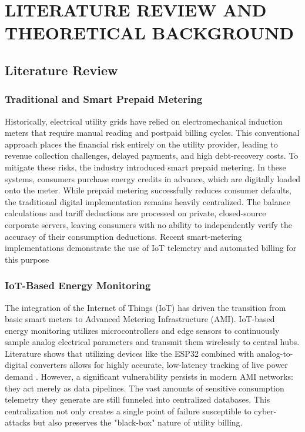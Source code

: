 \chapter{LITERATURE REVIEW AND THEORETICAL BACKGROUND}

\section{Literature Review}
\subsection{Traditional and Smart Prepaid Metering}
Historically, electrical utility grids have relied on electromechanical induction meters that require manual reading and postpaid billing cycles. This conventional approach places the financial risk entirely on the utility provider, leading to revenue collection challenges, delayed payments, and high debt-recovery costs. To mitigate these risks, the industry introduced smart prepaid metering. In these systems, consumers purchase energy credits in advance, which are digitally loaded onto the meter. While prepaid metering successfully reduces consumer defaults, the traditional digital implementation remains heavily centralized. The balance calculations and tariff deductions are processed on private, closed-source corporate servers, leaving consumers with no ability to independently verify the accuracy of their consumption deductions. Recent smart-metering implementations demonstrate the use of IoT telemetry and automated billing for this purpose 

\subsection{IoT-Based Energy Monitoring}
The integration of the Internet of Things (IoT) has driven the transition from basic smart meters to Advanced Metering Infrastructure (AMI). IoT-based energy monitoring utilizes microcontrollers and edge sensors to continuously sample analog electrical parameters and transmit them wirelessly to central hubs. Literature shows that utilizing devices like the ESP32 combined with analog-to-digital converters allows for highly accurate, low-latency tracking of live power demand \cite{zhao2020energy}. However, a significant vulnerability persists in modern AMI networks: they act merely as data pipelines. The vast amounts of sensitive consumption telemetry they generate are still funneled into centralized databases. This centralization not only creates a single point of failure susceptible to cyber-attacks but also preserves the "black-box" nature of utility billing.

